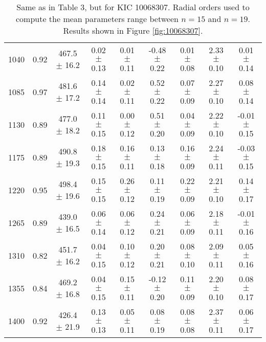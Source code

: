 \documentclass[twocolumn]{aastex61}%
\begin{document}
\begin{table*}[ht]
\begin{tabular}{ccc|ccccc|c}
1040 & 0.92 & 467.5 $\pm$ 16.2 & 0.02 $\pm$ 0.13 & 0.01 $\pm$ 0.11 & -0.48 $\pm$ 0.22 & 0.01 $\pm$ 0.08 & 2.33 $\pm$ 0.10 & 0.01 $\pm$ 0.14\\
1085 & 0.97 & 481.6 $\pm$ 17.2 & 0.14 $\pm$ 0.14 & 0.02 $\pm$ 0.11 & 0.52 $\pm$ 0.22 & 0.07 $\pm$ 0.09 & 2.27 $\pm$ 0.10 & 0.08 $\pm$ 0.14\\
1130 & 0.89 & 477.0 $\pm$ 18.2 & 0.11 $\pm$ 0.15 & 0.00 $\pm$ 0.12 & 0.51 $\pm$ 0.20 & 0.04 $\pm$ 0.09 & 2.22 $\pm$ 0.10 & -0.01 $\pm$ 0.15\\
1175 & 0.89 & 490.8 $\pm$ 19.3 & 0.18 $\pm$ 0.15 & 0.16 $\pm$ 0.11 & 0.13 $\pm$ 0.18 & 0.16 $\pm$ 0.09 & 2.24 $\pm$ 0.11 & -0.03 $\pm$ 0.15\\
1220 & 0.95 & 498.4 $\pm$ 19.6 & 0.15 $\pm$ 0.15 & 0.26 $\pm$ 0.12 & 0.11 $\pm$ 0.19 & 0.22 $\pm$ 0.09 & 2.21 $\pm$ 0.10 & 0.14 $\pm$ 0.17\\
1265 & 0.89 & 439.0 $\pm$ 16.5 & 0.06 $\pm$ 0.14 & 0.06 $\pm$ 0.12 & 0.24 $\pm$ 0.21 & 0.06 $\pm$ 0.09 & 2.18 $\pm$ 0.11 & -0.01 $\pm$ 0.16\\
1310 & 0.82 & 451.7 $\pm$ 16.2 & 0.04 $\pm$ 0.15 & 0.10 $\pm$ 0.12 & 0.20 $\pm$ 0.21 & 0.08 $\pm$ 0.10 & 2.09 $\pm$ 0.11 & 0.05 $\pm$ 0.16\\
1355 & 0.84 & 469.2 $\pm$ 16.8 & 0.04 $\pm$ 0.15 & 0.15 $\pm$ 0.11 & -0.12 $\pm$ 0.20 & 0.11 $\pm$ 0.09 & 2.20 $\pm$ 0.10 & 0.08 $\pm$ 0.17\\
1400 & 0.92 & 426.4 $\pm$ 21.9 & 0.13 $\pm$ 0.13 & 0.05 $\pm$ 0.11 & 0.08 $\pm$ 0.19 & 0.08 $\pm$ 0.08 & 2.37 $\pm$ 0.11 & 0.06 $\pm$ 0.17\\
\end{tabular}
\caption{Same as in Table 3, but for KIC 10068307. Radial orders used to compute the mean parameters range between $n=15$ and $n=19$. Results shown in Figure \ref{fig:10068307}.}\label{tab:10068307}
\end{table*}
\end{document}
